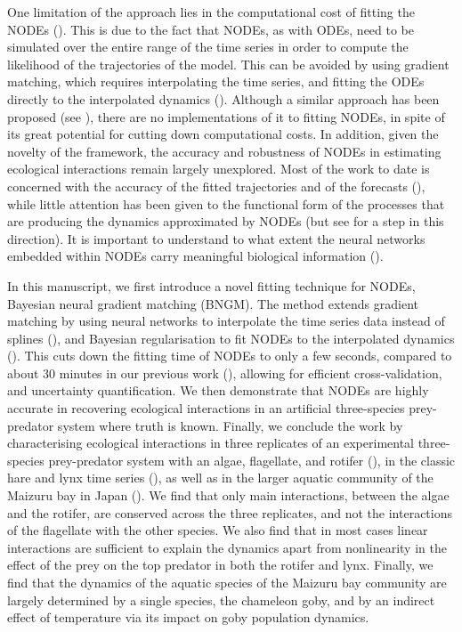 \documentclass[11pt, oneside]{article}
\begin{document}
One limitation of the approach lies in the computational cost of fitting the NODEs (\cite{Chen2018,Bonnaffe2021a}).
This is due to the fact that NODEs, as with ODEs, need to be simulated over the entire range of the time series in order to compute the likelihood of the trajectories of the model.
This can be avoided by using gradient matching, which requires interpolating the time series, and fitting the ODEs directly to the interpolated dynamics (\cite{Jost2000,Aarts2001,Ellner2002}).
Although a similar approach has been proposed (see \cite{Treven2021}), there are no implementations of it to fitting NODEs, in spite of its great potential for cutting down computational costs.
In addition, given the novelty of the framework, the accuracy and robustness of NODEs in estimating ecological interactions remain largely unexplored.
Most of the work to date is concerned with the accuracy of the fitted trajectories and of the forecasts (\cite{Mai2016,Treven2021,Frank2022}), while little attention has been given to the functional form of the processes that are producing the dynamics approximated by NODEs (but see \cite{Hu2020} for a step in this direction).
It is important to understand to what extent the neural networks embedded within NODEs carry meaningful biological information (\cite{Novak2021}).

In this manuscript, we first introduce a novel fitting technique for NODEs, Bayesian neural gradient matching (BNGM). 
The method extends gradient matching by using neural networks to interpolate the time series data instead of splines (\cite{Ellner2002}), and Bayesian regularisation to fit NODEs to the interpolated dynamics (\cite{Cawley2007}). 
This cuts down the fitting time of NODEs to only a few seconds, compared to about 30 minutes in our previous work (\cite{Bonnaffe2021a}), allowing for efficient cross-validation, and uncertainty quantification.
We then demonstrate that NODEs are highly accurate in recovering ecological interactions in an artificial three-species prey-predator system where truth is known.
Finally, we conclude the work by characterising ecological interactions in three replicates of an experimental three-species prey-predator system with an algae, flagellate, and rotifer (\cite{Hiltunen2013}), in the classic hare and lynx time series (\cite{Odum1972}), as well as in the larger aquatic community of the Maizuru bay in Japan (\cite{Ushio2018}).
We find that only main interactions, between the algae and the rotifer, are conserved across the three replicates, and not the interactions of the flagellate with the other species.
We also find that in most cases linear interactions are sufficient to explain the dynamics apart from nonlinearity in the effect of the prey on the top predator in both the rotifer and lynx.
Finally, we find that the dynamics of the aquatic species of the Maizuru bay community are largely determined by a single species, the chameleon goby, and by an indirect effect of temperature via its impact on goby population dynamics.
\end{document}
